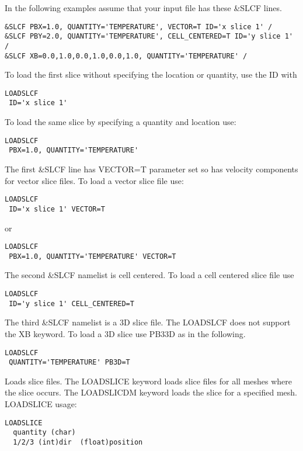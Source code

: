 \documentclass[11pt,twoside]{book}
\begin{document}
In the following examples assume that your input file has these  \&SLCF lines.

\begin{lstlisting}
&SLCF PBX=1.0, QUANTITY='TEMPERATURE', VECTOR=T ID='x slice 1' /
&SLCF PBY=2.0, QUANTITY='TEMPERATURE', CELL_CENTERED=T ID='y slice 1' /
&SLCF XB=0.0,1.0,0.0,1.0,0.0,1.0, QUANTITY='TEMPERATURE' /
\end{lstlisting}


\noindent To load the first slice without specifying the location or quantity, use the ID with
\begin{lstlisting}
LOADSLCF
 ID='x slice 1'
\end{lstlisting}

\noindent To load the same slice by specifying a quantity and location use:
\begin{lstlisting}
LOADSLCF
 PBX=1.0, QUANTITY='TEMPERATURE'
\end{lstlisting}

\noindent The first \&SLCF line has VECTOR=T parameter set so has velocity components for vector slice files.
To load a vector slice file use:
\begin{lstlisting}
LOADSLCF
 ID='x slice 1' VECTOR=T
\end{lstlisting}

\noindent or

\begin{lstlisting}
LOADSLCF
 PBX=1.0, QUANTITY='TEMPERATURE' VECTOR=T
\end{lstlisting}

\noindent The second \&SLCF namelist is cell centered.  To load a cell centered slice file use
\begin{lstlisting}
LOADSLCF
 ID='y slice 1' CELL_CENTERED=T
\end{lstlisting}

The third \&SLCF namelist is a 3D slice file.  The LOADSLCF does not support the XB keyword.
To load a 3D slice use PB33D as in the following.

\begin{lstlisting}
LOADSLCF
 QUANTITY='TEMPERATURE' PB3D=T
\end{lstlisting}

 Loads slice files.  The LOADSLICE keyword loads slice files for
all meshes where the slice occurs.  The LOADSLICDM keyword loads the slice for a specified mesh. LOADSLICE usage:
\begin{lstlisting}
LOADSLICE
  quantity (char)
  1/2/3 (int)dir  (float)position
\end{lstlisting}
\end{document}
